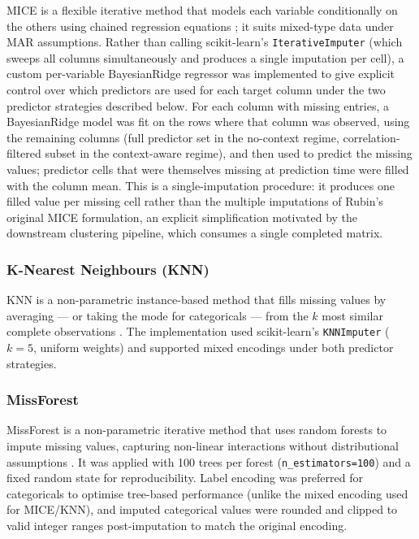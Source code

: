 MICE is a flexible iterative method that models each variable conditionally on the others using chained regression equations \cite{ref10}; it suits mixed-type data under MAR assumptions. Rather than calling scikit-learn's \texttt{IterativeImputer} (which sweeps all columns simultaneously and produces a single imputation per cell), a custom per-variable BayesianRidge regressor was implemented to give explicit control over which predictors are used for each target column under the two predictor strategies described below. For each column with missing entries, a BayesianRidge model was fit on the rows where that column was observed, using the remaining columns (full predictor set in the no-context regime, correlation-filtered subset in the context-aware regime), and then used to predict the missing values; predictor cells that were themselves missing at prediction time were filled with the column mean. This is a single-imputation procedure: it produces one filled value per missing cell rather than the multiple imputations of Rubin's original MICE formulation, an explicit simplification motivated by the downstream clustering pipeline, which consumes a single completed matrix.

\subsubsection{K-Nearest Neighbours (KNN)}

KNN is a non-parametric instance-based method that fills missing values by averaging --- or taking the mode for categoricals --- from the $k$ most similar complete observations \cite{ref11}. The implementation used scikit-learn's \texttt{KNNImputer} ($k=5$, uniform weights) and supported mixed encodings under both predictor strategies.

\subsubsection{MissForest}

MissForest is a non-parametric iterative method that uses random forests to impute missing values, capturing non-linear interactions without distributional assumptions \cite{ref12}. It was applied with 100 trees per forest (\texttt{n\_estimators=100}) and a fixed random state for reproducibility. Label encoding was preferred for categoricals to optimise tree-based performance (unlike the mixed encoding used for MICE/KNN), and imputed categorical values were rounded and clipped to valid integer ranges post-imputation to match the original encoding.

